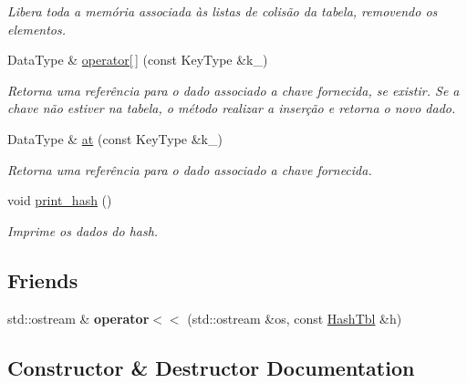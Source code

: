 \begin{DoxyCompactItemize}
\begin{DoxyCompactList}\small\item\em Libera toda a memória associada às listas de colisão da tabela, removendo os elementos. \end{DoxyCompactList}\item 
Data\+Type \& \hyperlink{classac_1_1HashTbl_a2afa09f4f299b65c575675152ba4415b}{operator\mbox{[}$\,$\mbox{]}} (const Key\+Type \&k\+\_\+)
\begin{DoxyCompactList}\small\item\em Retorna uma referência para o dado associado a chave fornecida, se existir. Se a chave não estiver na tabela, o método realizar a inserção e retorna o novo dado. \end{DoxyCompactList}\item 
Data\+Type \& \hyperlink{classac_1_1HashTbl_ac0933c629084aa2c996ecadc9dcee451}{at} (const Key\+Type \&k\+\_\+)
\begin{DoxyCompactList}\small\item\em Retorna uma referência para o dado associado a chave fornecida. \end{DoxyCompactList}\item 
\mbox{\label{classac_1_1HashTbl_a4a8d9a7fe26763596294c89dbe92c16f}} 
void \hyperlink{classac_1_1HashTbl_a4a8d9a7fe26763596294c89dbe92c16f}{print\+\_\+hash} ()
\begin{DoxyCompactList}\small\item\em Imprime os dados do hash. \end{DoxyCompactList}\end{DoxyCompactItemize}
\subsection*{Friends}
\begin{DoxyCompactItemize}
\item 
\mbox{\label{classac_1_1HashTbl_a1667c37762fa313023b57cc3f7d0f7a0}} 
std\+::ostream \& {\bfseries operator$<$$<$} (std\+::ostream \&os, const \hyperlink{classac_1_1HashTbl}{Hash\+Tbl} \&h)
\end{DoxyCompactItemize}


\subsection{Constructor \& Destructor Documentation}
\mbox{\label{classac_1_1HashTbl_aec48560515eb829449943d3c2086c4a6}} 
